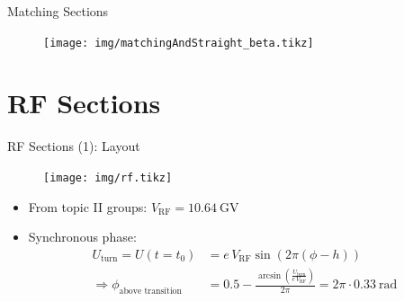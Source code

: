 \documentclass{beamer}
\begin{document}
\begin{frame}[t,fragile]{Matching Sections}
\begin{figure}
\centering
\texttt{[image: img/matchingAndStraight\_beta.tikz]}
\end{figure}
\end{frame}

\section{RF Sections}
\begin{frame}[t,fragile]{RF Sections (1): Layout}
\begin{figure}
\centering
\texttt{[image: img/rf.tikz]}
\end{figure}
\begin{itemize}
\item From topic II groups: $V_\text{RF}=\SI{10.64}{\giga\volt}$
\item Synchronous phase:
\begin{align*}
U_\text{turn} = U(t=t_0) &= e\,V_\text{RF} \sin\left(2\pi(\phi-h)\right)\\
\Rightarrow \phi_\text{above transition} &= 0.5 - \frac{\arcsin\left(\frac{U_\text{turn}}{e\,V_\text{RF}}\right)}{2\pi} = 2\pi\cdot\SI{0.33}{\radian}
\end{align*}
\end{itemize}
\end{frame}
\end{document}
